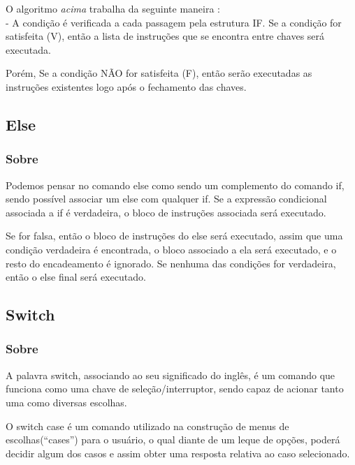 \documentclass[a4paper,12pt]{article}  %
\begin{document}
  O algoritmo \textit{acima} trabalha da seguinte maneira :
 \\

  -  A condição é verificada a cada passagem pela estrutura IF. Se a condição for satisfeita (V), então a lista de instruções que se encontra entre chaves será executada. \newline
   
  Porém, Se a condição NÃO for satisfeita (F), então serão executadas as instruções existentes logo após o fechamento das chaves.
 
 \subsection{Else}
 \subsubsection{Sobre} %

   Podemos pensar no comando else como sendo um complemento do comando if, sendo possível associar um else com qualquer if. Se a expressão condicional associada a if é verdadeira, o bloco de instruções associada será executado. \newline 

   Se for falsa, então o bloco de instruções do else será executado, assim que uma condição verdadeira é encontrada, o bloco associado a ela será executado, e o resto do encadeamento é ignorado. \newline 
Se nenhuma das condições for verdadeira, então o else final será executado.

  
 \subsection{Switch}
 \subsubsection{Sobre} %
    
   A palavra switch, associando ao seu significado do inglês, é um comando que funciona como uma chave de seleção/interruptor, sendo capaz de acionar tanto uma como diversas escolhas. \newline
   
   O switch case é um comando utilizado na construção de menus de escolhas(“cases”) para o usuário, o qual diante de um leque de opções, poderá decidir algum dos casos e assim obter uma resposta relativa ao caso selecionado.
 
\end{document}
